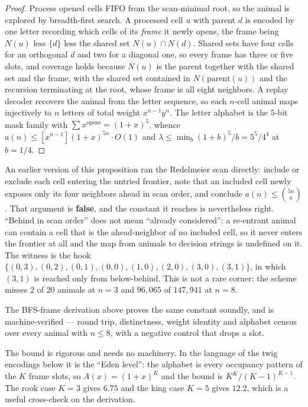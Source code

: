 \documentclass[11pt]{article}
\begin{document}
\begin{proof}
Process opened cells FIFO from the scan-minimal root, so the animal is explored
by breadth-first search. A processed cell $u$ with parent $d$ is encoded by one
letter recording which cells of its \emph{frame} it newly opens, the frame being
$N(u)$ less $\{d\}$ less the shared set $N(u) \cap N(d)$. Shared sets have four
cells for an orthogonal $d$ and two for a diagonal one, so every frame has three
or five slots, and coverage holds because $N(u)$ is the parent together with the
shared set and the frame, with the shared set contained in $N(\mathrm{parent}(u))$
and the recursion terminating at the root, whose frame is all eight neighbors.
A replay decoder recovers the animal from the letter sequence, so each $n$-cell
animal maps injectively to $n$ letters of total weight $x^{n-1}y^n$. The letter
alphabet is the $5$-bit mask family with $\sum x^{\mathrm{opens}} = (1+x)^5$,
whence $a(n) \le [x^{n-1}](1+x)^{5n}\cdot O(1)$ and
$\lambda \le \min_b (1+b)^5/b = 5^5/4^4$ at $b = 1/4$.
\end{proof}

\begin{remark}
\label{rem:repair}
An earlier version of this proposition ran the Redelmeier scan directly: include
or exclude each cell entering the untried frontier, note that an included cell
newly exposes only its four neighbors ahead in scan order, and conclude
$a(n) \le \binom{5n}{n}$. That argument is \textbf{false}, and the constant it
reaches is nevertheless right. ``Behind in scan order'' does not mean ``already
considered'': a re-entrant animal can contain a cell that is the ahead-neighbor
of no included cell, so it never enters the frontier at all and the map from
animals to decision strings is undefined on it. The witness is the hook
$\{(0,3),(0,2),(0,1),(0,0),(1,0),(2,0),(3,0),(3,1)\}$, in which $(3,1)$ is
reached only from below-behind. This is not a rare corner: the scheme misses
$2$ of $20$ animals at $n = 3$ and $96{,}065$ of $147{,}941$ at $n = 8$.

The BFS-frame derivation above proves the same constant soundly, and is
machine-verified --- round trip, distinctness, weight identity and alphabet
census over every animal with $n \le 8$, with a negative control that drops a slot.
\end{remark}

The bound is rigorous and needs no machinery. In the language of the twig
encodings below it is the ``Eden level'': the alphabet is every occupancy pattern
of the $K$ frame slots, so $A(x) = (1+x)^K$ and the bound is $K^K/(K-1)^{K-1}$.
The rook case $K = 3$ gives $6.75$ and the king case $K = 5$ gives $12.2$, which
is a useful cross-check on the derivation.
\end{document}
